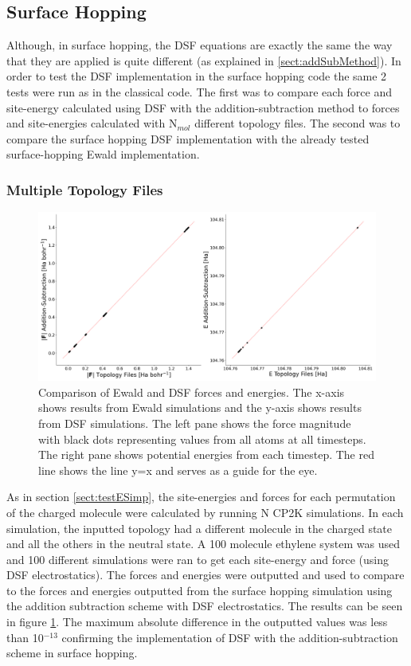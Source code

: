 \subsection{Surface Hopping}
Although, in surface hopping, the DSF equations are exactly the same the way that they are applied is quite different (as explained in \ref{sect:addSubMethod}). In order to test the DSF implementation in the surface hopping code the same 2 tests were run as in the classical code. The first was to compare each force and site-energy calculated using DSF with the addition-subtraction method to forces and site-energies calculated with N$_{mol}$ different topology files. The second was to compare the surface hopping DSF implementation with the already tested surface-hopping Ewald implementation.
\subsubsection{Multiple Topology Files}
\begin{figure}[ht]
  \includegraphics[width=\textwidth]{./img/ES/DSF_SH_test_topologies.png}
  \caption{\label{fig:FSSH_DSF_top}Comparison of Ewald and DSF forces and energies. The x-axis shows results from Ewald simulations and the y-axis shows results from DSF simulations. The left pane shows the force magnitude with black dots representing values from all atoms at all timesteps. The right pane shows potential energies from each timestep. The red line shows the line y=x and serves as a guide for the eye.}
\end{figure}
\noindent As in section \ref{sect:testESimp}, the site-energies and forces for each permutation of the charged molecule were calculated by running N CP2K simulations. In each simulation, the inputted topology had a different molecule in the charged state and all the others in the neutral state. A 100 molecule ethylene system was used and 100 different simulations were ran to get each site-energy and force (using DSF electrostatics). The forces and energies were outputted and used to compare to the forces and energies outputted from the surface hopping simulation using the addition subtraction scheme with DSF electrostatics. The results can be seen in figure \ref{fig:FSSH_DSF_top}. The maximum absolute difference in the outputted values was less than 10$^{-13}$ confirming the implementation of DSF with the addition-subtraction scheme in surface hopping.
